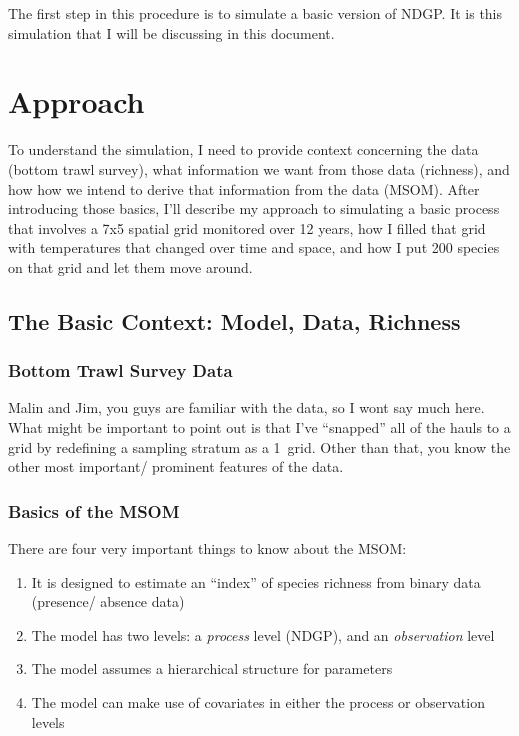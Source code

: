 \documentclass{article}\usepackage[]{graphicx}\usepackage[]{color}
\begin{document}
\par
The first step in this procedure is to simulate a basic version of NDGP. It is this simulation that I will be discussing in this document.

\section{Approach}
To understand the simulation, I need to provide context concerning the data (bottom trawl survey), what information we want from those data (richness), and how how we intend to derive that information from the data (MSOM). After introducing those basics, I'll describe my approach to simulating a basic process that involves a 7x5 spatial grid monitored over 12 years, how I filled that grid with temperatures that changed over time and space, and how I put 200 species on that grid and let them move around. 

\subsection{The Basic Context: Model, Data, Richness}


\subsubsection{Bottom Trawl Survey Data}
Malin and Jim, you guys are familiar with the data, so I wont say much here. What might be important to point out is that I've ``snapped'' all of the hauls to a grid by redefining a sampling stratum as a 1\degree~grid. Other than that, you know the other most important/ prominent features of the data.

\subsubsection{Basics of the MSOM}
There are four very important things to know about the MSOM:
\begin{enumerate}
		\item It is designed to estimate an ``index'' of species richness from binary data (presence/ absence data)
		\item The model has two levels: a \emph{process} level (NDGP), and an \emph{observation} level
		\item The model assumes a hierarchical structure for parameters
		\item The model can make use of covariates in either the process or observation levels
\end{enumerate}
\end{document}
